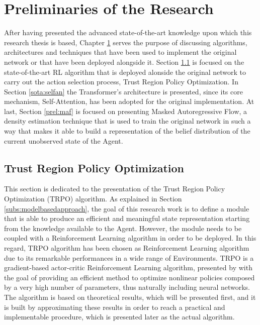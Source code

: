 \chapter{Preliminaries of the Research}
    \label{chap:prel}
    After having presented the advanced state-of-the-art knowledge upon which this research thesis is based, Chapter \ref{chap:prel} serves the purpose of discussing algorithms, architectures and techniques that have been used to implement the original network or that have been deployed alongside it. Section \ref{sota:trpo} is focused on the state-of-the-art RL algorithm that is deployed alonside the original network to carry out the action selection process, Trust Region Policy Optimization. In Section \ref{sota:selfan} the Transformer's architecture is presented, since its core mechanism, Self-Attention, has been adopted for the original implementation. At last, Section \ref{prel:maf} is focused on presenting Masked Autoregressive Flow, a density estimation technique that is used to train the original network in such a way that makes it able to build a representation of the belief distribution of the current unobserved state of the Agent.
    
    \section{Trust Region Policy Optimization}
        \label{sota:trpo}
        This section is dedicated to the presentation of the Trust Region Policy Optimization (TRPO) algorithm. As explained in Section \ref{subs:modelbasedapproach}, the goal of this research work is to define a module that is able to produce an efficient and meaningful state representation starting from the knowledge available to the Agent. However, the module needs to be coupled with a Reinforcement Learning algorithm in order to be deployed. In this regard, TRPO algorithm has been chosen as Reinforcement Learning algorithm due to its remarkable performances in a wide range of Environments. \newline
        TRPO is a gradient-based actor-critic Reinforcement Learning algorithm, presented by  with the goal of providing an efficient method to optimize nonlinear policies composed by a very high number of parameters, thus naturally including neural networks. The algorithm is based on theoretical results, which will be presented first, and it is built by approximating these results in order to reach a practical and implementable procedure, which is presented later as the actual algorithm.
        
